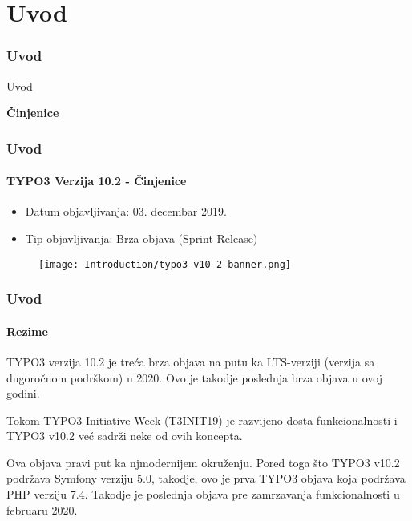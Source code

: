 %

\section{Uvod}
\begin{frame}[fragile]
	\frametitle{Uvod}

	\begin{center}\huge{Uvod}\end{center}
	\begin{center}\huge{\color{typo3darkgrey}\textbf{Činjenice}}\end{center}

\end{frame}


\begin{frame}[fragile]
	\frametitle{Uvod}
	\framesubtitle{TYPO3 Verzija 10.2 - Činjenice}

	\begin{itemize}
		\item Datum objavljivanja: 03. decembar 2019.
		\item Tip objavljivanja: Brza objava (Sprint Release)
	\end{itemize}

	\begin{figure}
		\texttt{[image: Introduction/typo3-v10-2-banner.png]}
	\end{figure}

\end{frame}


\begin{frame}[fragile]
	\frametitle{Uvod}
	\framesubtitle{Rezime}

	\small
		TYPO3 verzija 10.2 je treća brza objava na putu ka LTS-verziji (verzija sa
		dugoročnom podrškom) u 2020. Ovo je takodje poslednja brza objava u ovoj godini.

		\vspace{0.2cm}

		Tokom TYPO3 Initiative Week (T3INIT19) je razvijeno dosta funkcionalnosti
		i TYPO3 v10.2 već sadrži neke od ovih koncepta.

		\vspace{0.2cm}

		Ova objava pravi put ka njmodernijem okruženju. Pored toga što TYPO3 v10.2 podržava
		Symfony verziju 5.0, takodje, ovo je prva TYPO3 objava koja podržava
		PHP verziju 7.4. Takodje je poslednja objava pre zamrzavanja funkcionalnosti
		u februaru 2020.

	\normalsize

\end{frame}

